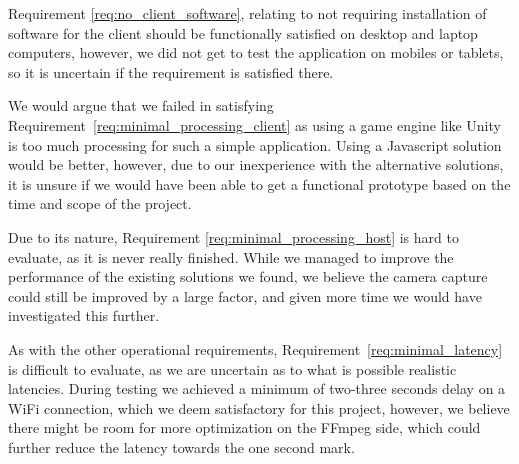 Requirement \ref{req:no_client_software}, relating to not requiring installation of software for the client should be functionally satisfied on desktop and laptop computers, however, we did not get to test the application on mobiles or tablets, so it is uncertain if the requirement is satisfied there. 

We would argue that we failed in satisfying Requirement~\ref{req:minimal_processing_client} as using a game engine like Unity is too much processing for such a simple application. Using a Javascript solution would be better, however, due to our inexperience with the alternative solutions, it is unsure if we would have been able to get a functional prototype based on the time and scope of the project.

Due to its nature, Requirement \ref{req:minimal_processing_host} is hard to evaluate, as it is never really finished. While we managed to improve the performance of the existing solutions we found, we believe the camera capture could still be improved by a large factor, and given more time we would have investigated this further.

As with the other operational requirements, Requirement~\ref{req:minimal_latency} is difficult to evaluate, as we are uncertain as to what is possible realistic latencies. During testing we achieved a minimum of two-three seconds delay on a WiFi connection, which we deem satisfactory for this project, however, we believe there might be room for more optimization on the FFmpeg side, which could further reduce the latency towards the one second mark.
